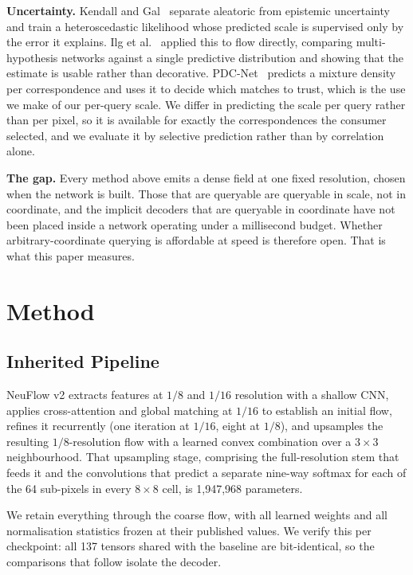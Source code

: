 \documentclass[conference]{IEEEtran}
\begin{document}
\textbf{Uncertainty.} Kendall and Gal~\cite{kendall} separate aleatoric from
epistemic uncertainty and train a heteroscedastic likelihood whose predicted
scale is supervised only by the error it explains. Ilg et al.~\cite{ilg18}
applied this to flow directly, comparing multi-hypothesis networks against a
single predictive distribution and showing that the estimate is usable rather
than decorative. PDC-Net~\cite{pdcnet} predicts a mixture density per
correspondence and uses it to decide which matches to trust, which is the use we
make of our per-query scale. We differ in predicting the scale per query rather
than per pixel, so it is available for exactly the correspondences the consumer
selected, and we evaluate it by selective prediction rather than by correlation
alone.

\textbf{The gap.} Every method above emits a dense field at one fixed resolution,
chosen when the network is built. Those that are queryable are queryable in
scale, not in coordinate, and the implicit decoders that are queryable in
coordinate have not been placed inside a network operating under a millisecond
budget. Whether arbitrary-coordinate querying is affordable at speed is therefore
open. That is what this paper measures.

\section{Method}

\subsection{Inherited Pipeline}

NeuFlow v2 extracts features at $1/8$ and $1/16$ resolution with a shallow CNN,
applies cross-attention and global matching at $1/16$ to establish an initial
flow, refines it recurrently (one iteration at $1/16$, eight at $1/8$), and
upsamples the resulting $1/8$-resolution flow with a learned convex combination
over a $3{\times}3$ neighbourhood. That upsampling stage, comprising the
full-resolution stem that feeds it and the convolutions that predict a separate
nine-way softmax for each of the 64 sub-pixels in every $8{\times}8$ cell, is
1{,}947{,}968 parameters.

We retain everything through the coarse flow, with all learned weights and all
normalisation statistics frozen at their published values. We verify this per
checkpoint: all 137 tensors shared with the baseline are bit-identical, so the
comparisons that follow isolate the decoder.
\end{document}
